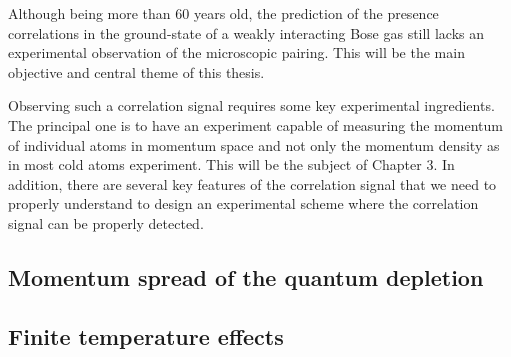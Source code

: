 Although being more than 60 years old, the prediction of the presence \kmk correlations in the ground-state of a weakly interacting Bose gas still lacks an experimental observation of the microscopic \kmk pairing. This will be the main objective and central theme of this thesis. 

Observing such a correlation signal requires some key experimental ingredients. The principal one is to have an experiment capable of measuring the momentum of individual atoms in momentum space and not only the momentum density as in most cold atoms experiment. This will be the subject of Chapter 3. In addition, there are several key features of the \kmk correlation signal that we need to properly understand to design an experimental scheme where the \kmk correlation signal can be properly detected.

\subsection{Momentum spread of the quantum depletion}

\subsection{Finite temperature effects}

